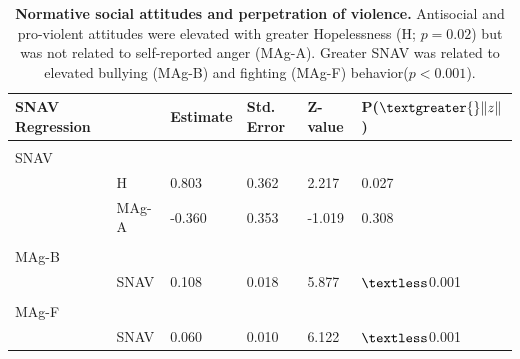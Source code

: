 \documentclass[utf8]{article}
\begin{document}
\begin{table}[h!]
\end{table}

\begin{table}[]
\begin{tabular}{llllll}
SNAV Regression &       & Estimate & Std. Error & Z-value & P($\textgreater{}\|z\|$) \\ \hline
                      &       &          &            &         &                          \\
SNAV                  &       &          &            &         &                          \\
                      & H     & 0.803    & 0.362      & 2.217   & 0.027                    \\
                      & MAg-A & -0.360   & 0.353      & -1.019  & 0.308                    \\
                      &       &          &            &         &                          \\
MAg-B                 &       &          &            &         &                          \\
                      & SNAV  & 0.108    & 0.018      & 5.877   & $\textless$0.001                    \\
                      &       &          &            &         &                          \\
MAg-F                 &       &          &            &         &                          \\
                      & SNAV  & 0.060    & 0.010      & 6.122   & $\textless$0.001                   
\end{tabular}
\caption{\textbf{Normative social attitudes and perpetration of violence.} Antisocial and pro-violent attitudes were elevated with greater Hopelessness (H; $p=0.02$) but was not related to self-reported anger (MAg-A). Greater SNAV was related to elevated bullying (MAg-B) and fighting (MAg-F) behavior($p<0.001$). \label{tab:13}}
\end{table}
\clearpage
\end{document}
